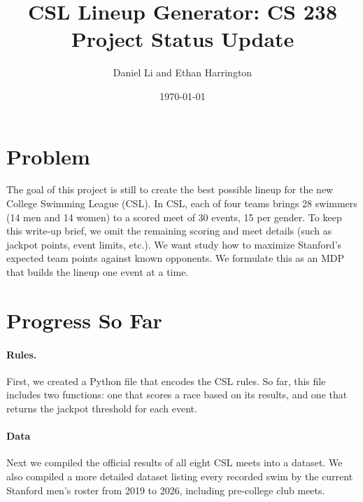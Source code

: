 \documentclass[11pt]{article}
\title{CSL Lineup Generator: CS 238 Project Status Update}
\author{Daniel Li and Ethan Harrington}
\date{\today}
\begin{document}
\maketitle

\section{Problem}

The goal of this project is still to create the best possible lineup for the new College Swimming League (CSL). In CSL, each of four teams brings 28 swimmers (14 men and 14 women) to a scored meet of 30 events, 15 per gender. To keep this write-up brief, we omit the remaining scoring and meet details (such as jackpot points, event limits, etc.). We want study how to maximize Stanford's expected team points against known opponents. We formulate this as an MDP that builds the lineup one event at a time.

\section{Progress So Far}

\paragraph{Rules.} First, we created a Python file that encodes the CSL rules. So far, this file includes two functions: one that scores a race based on its results, and one that returns the jackpot threshold for each event.

\paragraph{Data} Next we compiled the official results of all eight CSL meets into a dataset. We also compiled a more detailed dataset listing every recorded swim by the current Stanford men's roster from 2019 to 2026, including pre-college club meets.
\end{document}
